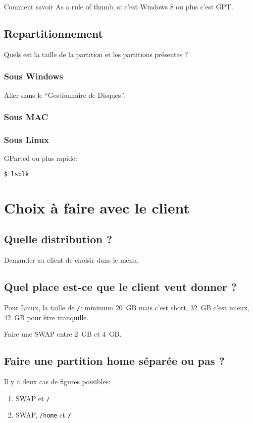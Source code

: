 \documentclass{../guide}
\begin{document}
Comment savoir 
As a rule of thumb, si c'est Windows 8 ou plus c'est GPT.

\subsection{Repartitionnement}
Quels est la taille de la partition et les partitions présentes ?
\subsubsection{Sous Windows}
Aller dans le ``Gestionnaire de Disques''.
\subsubsection{Sous MAC}
\subsubsection{Sous Linux}
GParted ou plus rapide:
\begin{verbatim}
$ lsblk
\end{verbatim}

\section{Choix à faire avec le client}

\subsection{Quelle distribution ?}
Demander au client de choisir dans le menu.

\subsection{Quel place est-ce que le client veut donner ?}
Pour Linux, la taille de \verb|/|: minimum \SI{20}{GB} mais c'est short, \SI{32}{GB} c'est mieux, \SI{42}{GB} pour être tranquille.

Faire une SWAP entre \SI{2}{GB} et \SI{4}{\giga B}.

\subsection{Faire une partition home séparée ou pas ?}
Il y a deux cas de figures possibles:
\begin{enumerate}
  \item SWAP et \verb|/|
  \item SWAP, \verb|/home| et \verb|/|
\end{enumerate}
\end{document}
